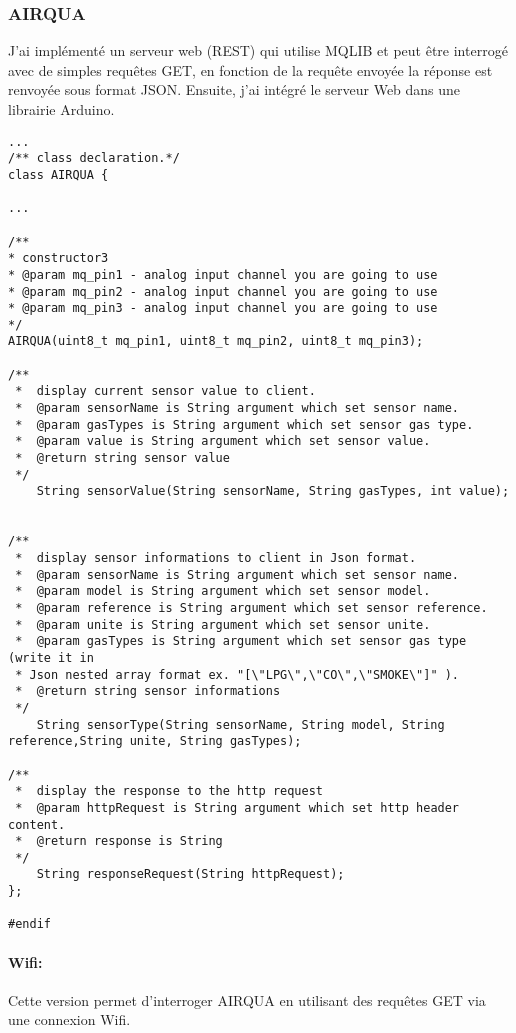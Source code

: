 \subsubsection{AIRQUA}
J'ai implémenté un serveur web (REST) qui utilise MQLIB et peut être interrogé avec de simples requêtes GET, en fonction de la requête envoyée la réponse est renvoyée sous format JSON. Ensuite, j'ai intégré le serveur Web dans une librairie Arduino. 
\begin{lstlisting}
...
/** class declaration.*/
class AIRQUA {

...

/** 
* constructor3
* @param mq_pin1 - analog input channel you are going to use
* @param mq_pin2 - analog input channel you are going to use
* @param mq_pin3 - analog input channel you are going to use
*/
AIRQUA(uint8_t mq_pin1, uint8_t mq_pin2, uint8_t mq_pin3);

/**
 *  display current sensor value to client.
 *  @param sensorName is String argument which set sensor name.
 *  @param gasTypes is String argument which set sensor gas type.
 *  @param value is String argument which set sensor value.
 *  @return string sensor value
 */
    String sensorValue(String sensorName, String gasTypes, int value);


/**
 *  display sensor informations to client in Json format.
 *  @param sensorName is String argument which set sensor name.
 *  @param model is String argument which set sensor model.
 *  @param reference is String argument which set sensor reference.
 *  @param unite is String argument which set sensor unite.
 *  @param gasTypes is String argument which set sensor gas type (write it in
 * Json nested array format ex. "[\"LPG\",\"CO\",\"SMOKE\"]" ).
 *  @return string sensor informations
 */
    String sensorType(String sensorName, String model, String reference,String unite, String gasTypes);

/**
 *  display the response to the http request
 *  @param httpRequest is String argument which set http header content.
 *  @return response is String 
 */
    String responseRequest(String httpRequest);
};

#endif

\end{lstlisting}
\paragraph{Wifi:}
Cette version permet d’interroger AIRQUA en utilisant des requêtes GET via une connexion Wifi.

